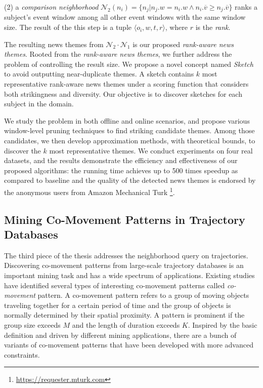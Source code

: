 (2) a \emph{comparison neighborhood} $\mathcal{N}_2(n_i) = \{n_j | n_j.w = n_i.w \wedge n_i.\overline{v} \geq n_j.\overline{v} \}$ ranks a subject's event window among all other event windows with the same window size. The result of the this step is a tuple $\langle o_i, w, t, r \rangle$, where $r$ is the \emph{rank}.

The resulting news themes from $\mathcal{N}_2 \cdot \mathcal{N}_1$ is our proposed \emph{rank-aware news themes}. Rooted from the \emph{rank-aware news themes}, we further address the problem 
of controlling the result size.
We propose
a novel concept named \emph{Sketch} to avoid outputting near-duplicate themes.
A sketch contains $k$ most representative rank-aware news themes under a scoring function that considers both strikingness and diversity.  Our objective is to discover sketches for each subject in the domain.

We study the problem in both
offline and online scenarios, and propose various window-level 
pruning techniques to find striking candidate themes.
Among those candidates, we then develop approximation
methods, with theoretical bounds, to discover the $k$ most
representative themes. We conduct experiments on four real
datasets, and the results demonstrate the efficiency and 
effectiveness of our proposed algorithms: the running time
achieves up to 500 times speedup as compared to baseline and the quality of the
detected news themes is endorsed by the anonymous users
from Amazon Mechanical Turk \footnote{\url{https://requester.mturk.com}}.

\subsection{Mining Co-Movement Patterns in Trajectory Databases}
The third piece of the thesis addresses the neighborhood
query on trajectories.
Discovering co-movement patterns from large-scale trajectory 
databases is an important mining task and has a wide
spectrum of applications. 
Existing studies have identified several types of interesting co-movement patterns called \emph{co-movement} pattern. A co-movement pattern refers to a group of moving objects traveling together for a certain period of time and the group of objects is normally determined by their spatial proximity. A pattern is prominent if the group size exceeds $M$ and the length of duration exceeds $K$. 
Inspired by the basic definition 
and driven by different mining applications, there are a bunch of variants 
of co-movement patterns that have been developed with more advanced constraints.

